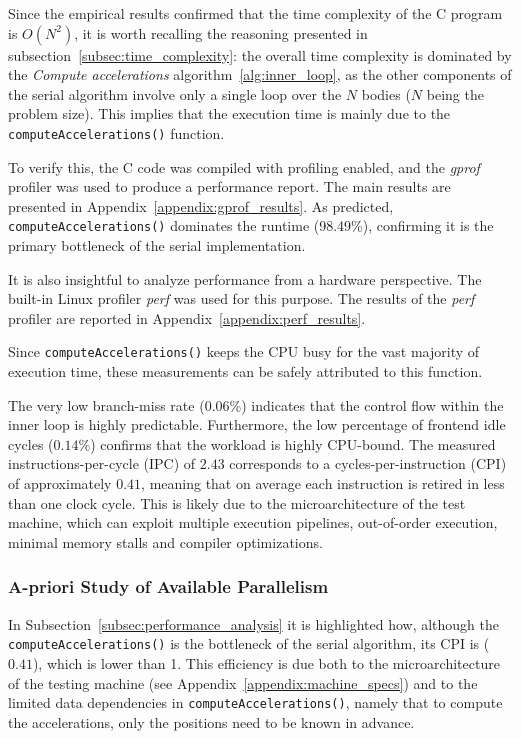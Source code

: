 \documentclass{article}
\begin{document}
Since the empirical results confirmed that the time complexity of the C program is $O(N^2)$, it is worth recalling the reasoning presented in subsection~\ref{subsec:time_complexity}: the overall time complexity is dominated by the \emph{Compute accelerations} algorithm~\ref{alg:inner_loop}, as the other components of the serial algorithm involve only a single loop over the $N$ bodies ($N$ being the problem size).
This implies that the execution time is mainly due to the \texttt{compute\discretionary{}{}{}Accelerations()} function.

To verify this, the C code was compiled with profiling enabled, and the \emph{gprof} profiler 
was used to produce a performance report. The main results are presented in 
Appendix~\ref{appendix:gprof_results}.
As predicted, \texttt{computeAccelerations()} dominates the runtime (98.49\%), confirming it is the primary bottleneck of the serial implementation.

It is also insightful to analyze performance from a hardware perspective. The built-in Linux profiler \emph{perf} was used for this purpose.
The results of the \emph{perf} profiler are reported in Appendix~\ref{appendix:perf_results}.

Since \texttt{compute\discretionary{}{}{}Accelerations()} keeps the CPU busy for the vast majority of execution time, these measurements can be safely attributed to this function.

The very low branch-miss rate ($0.06\%$) indicates that the control flow within the inner loop is highly predictable. Furthermore, the low percentage of frontend idle cycles ($0.14\%$) confirms that the workload is highly CPU-bound.
The measured instructions-per-cycle (IPC) of $2.43$ corresponds to a cycles-per-instruction (CPI) of approximately $0.41$, meaning that on average each instruction is retired in less than one clock cycle. This is likely due to the microarchitecture of the test machine, which can exploit multiple execution pipelines, out-of-order execution, minimal memory stalls and compiler optimizations.

\subsubsection{A-priori Study of Available Parallelism}
\label{subsec:apriori_parallelism}
In Subsection~\ref{subsec:performance_analysis} it is highlighted how, although the \texttt{compute\discretionary{}{}{}Accelerations()} is the bottleneck of the serial algorithm, its CPI is ($0.41$), which is lower than 1.
This efficiency is due both to the microarchitecture of the testing machine (see Appendix~\ref{appendix:machine_specs}) and to the limited data dependencies in 
\texttt{compute\discretionary{}{}{}Accelerations()}, namely that to compute the accelerations, 
only the positions need to be known in advance.
\end{document}
